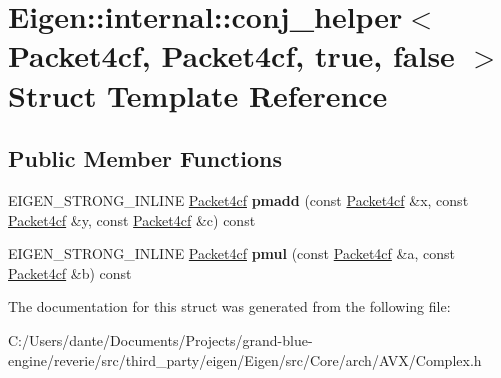 \hypertarget{struct_eigen_1_1internal_1_1conj__helper_3_01_packet4cf_00_01_packet4cf_00_01true_00_01false_01_4}{}\section{Eigen\+::internal\+::conj\+\_\+helper$<$ Packet4cf, Packet4cf, true, false $>$ Struct Template Reference}
\label{struct_eigen_1_1internal_1_1conj__helper_3_01_packet4cf_00_01_packet4cf_00_01true_00_01false_01_4}
\subsection*{Public Member Functions}
\begin{DoxyCompactItemize}
\item 
\mbox{\label{struct_eigen_1_1internal_1_1conj__helper_3_01_packet4cf_00_01_packet4cf_00_01true_00_01false_01_4_a31f5ab661b7a9412aac6e9ec5d0e47e7}} 
E\+I\+G\+E\+N\+\_\+\+S\+T\+R\+O\+N\+G\+\_\+\+I\+N\+L\+I\+NE \mbox{\hyperlink{struct_eigen_1_1internal_1_1_packet4cf}{Packet4cf}} {\bfseries pmadd} (const \mbox{\hyperlink{struct_eigen_1_1internal_1_1_packet4cf}{Packet4cf}} \&x, const \mbox{\hyperlink{struct_eigen_1_1internal_1_1_packet4cf}{Packet4cf}} \&y, const \mbox{\hyperlink{struct_eigen_1_1internal_1_1_packet4cf}{Packet4cf}} \&c) const
\item 
\mbox{\label{struct_eigen_1_1internal_1_1conj__helper_3_01_packet4cf_00_01_packet4cf_00_01true_00_01false_01_4_a18cb647e7118b87040773cb6ba846076}} 
E\+I\+G\+E\+N\+\_\+\+S\+T\+R\+O\+N\+G\+\_\+\+I\+N\+L\+I\+NE \mbox{\hyperlink{struct_eigen_1_1internal_1_1_packet4cf}{Packet4cf}} {\bfseries pmul} (const \mbox{\hyperlink{struct_eigen_1_1internal_1_1_packet4cf}{Packet4cf}} \&a, const \mbox{\hyperlink{struct_eigen_1_1internal_1_1_packet4cf}{Packet4cf}} \&b) const
\end{DoxyCompactItemize}


The documentation for this struct was generated from the following file\+:\begin{DoxyCompactItemize}
\item 
C\+:/\+Users/dante/\+Documents/\+Projects/grand-\/blue-\/engine/reverie/src/third\+\_\+party/eigen/\+Eigen/src/\+Core/arch/\+A\+V\+X/Complex.\+h\end{DoxyCompactItemize}
